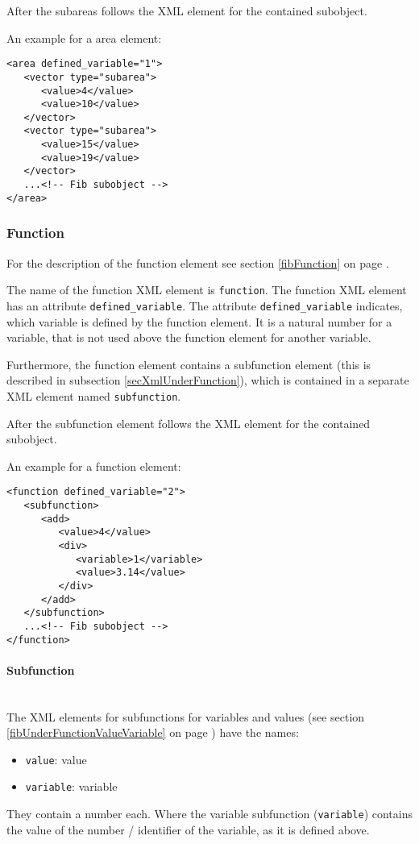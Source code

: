 After the subareas follows the XML element for the contained subobject.

\bigskip\noindent
An example for a area element:
\begin{verbatim}
<area defined_variable="1">
   <vector type="subarea">
      <value>4</value>
      <value>10</value>
   </vector>
   <vector type="subarea">
      <value>15</value>
      <value>19</value>
   </vector>
   ...<!-- Fib subobject -->
</area>
\end{verbatim}



\subsubsection{Function}

For the description of the function element see section \ref{fibFunction} on page \pageref{fibFunction} .

The name of the function XML element is \verb|function|. The function XML element has an attribute \verb|defined_variable|. The attribute \verb|defined_variable| indicates, which variable is defined by the function element. It is a natural number for a variable, that is not used above the function element for another variable.

Furthermore, the function element contains a subfunction element (this is described in subsection \ref{secXmlUnderFunction}), which is contained in a separate XML element named \verb|subfunction|.

After the subfunction element follows the XML element for the contained subobject.

\bigskip\noindent
An example for a function element:
\begin{verbatim}
<function defined_variable="2">
   <subfunction>
      <add>
         <value>4</value>
         <div>
            <variable>1</variable>
            <value>3.14</value>
         </div>
      </add>
   </subfunction>
   ...<!-- Fib subobject -->
</function>
\end{verbatim}


\paragraph{Subfunction}
\label{secXmlUnderFunction}

\ \\
The XML elements for subfunctions for variables and values (see section \ref{fibUnderFunctionValueVariable} on page \pageref{fibUnderFunctionValueVariable}) have the names:
\begin{itemize}
 \item \verb|value|: value
 \item \verb|variable|: variable
\end{itemize}
They contain a number each.
Where the variable subfunction (\verb|variable|) contains the value of the number / identifier of the variable, as it is defined above.

